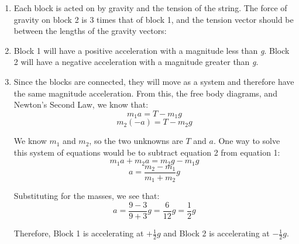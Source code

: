 \begin{Answer}[ref = block1]
\begin{enumerate}
    \item Each block is acted on by gravity and the tension of the string. The 
    force of gravity on block 2 is 3 times that of block 1, and the tension 
    vector should be between the lengths of the gravity vectors:
    \begin{center}
    \end{center}

    \item Block 1 will have a positive acceleration with a magnitude less than 
    \textit{g}. Block 2 will have a negative acceleration with a magnitude 
    greater than \textit{g}.

    \item Since the blocks are connected, they will move as a system and 
    therefore have the same magnitude acceleration. From this, the free body 
    diagrams, and Newton's Second Law, we know that:
    $$m_1 a  = T - m_1 g$$
    $$m_2 \left( - a \right) = T - m_2 g$$

    We know $m_1$ and $m_2$, so the two unknowns are $T$ and $a$. One way to 
    solve this system of equations would be to subtract equation 2 from equation 1:
    $$m_1 a + m_2 a = m_2 g - m_1 g$$
    $$a = \frac{m_2 - m_1}{m_1 + m_2} g$$

    Substituting for the masses, we see that:
    $$a = \frac{9 - 3}{9 + 3}g = \frac{6}{12}g = \frac{1}{2}g$$

    Therefore, Block 1 is accelerating at $+\frac{1}{2}g$ and Block 2 is 
    accelerating at $-\frac{1}{2}g$.
\end{enumerate}
\end{Answer}

